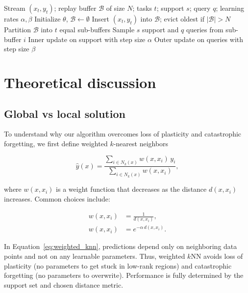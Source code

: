 \documentclass{article}
\begin{document}
\begin{algorithm}[t]
\caption{MAML with Replay Buffer (work in progress)}
\label{alg:maml_replay}
\begin{algorithmic}[1]
\Require Stream $(x_t,y_t)$; replay buffer $\mathcal{B}$ of size $N$; 
tasks $t$; support $s$; query $q$; learning rates $\alpha,\beta$
\State Initialize $\theta$, $\mathcal{B} \gets \emptyset$
    \State Insert $(x_t,y_t)$ into $\mathcal{B}$; evict oldest if $|\mathcal{B}|>N$
    \State Partition $\mathcal{B}$ into $t$ equal sub-buffers
        \State Sample $s$ support and $q$ queries from sub-buffer $i$
        \State Inner update on support with step size $\alpha$
        \State Outer update on queries with step size $\beta$
    \EndFor
\EndFor
\end{algorithmic}
\end{algorithm}


\section{Theoretical discussion}
\label{sec:theory}

\subsection{Global vs local solution}
\label{sec:local_global}
To understand why our algorithm overcomes loss of plasticity and catastrophic forgetting, we
first define weighted $k$-nearest neighbors

\begin{equation}
\hat{y}(x) = 
\frac{\sum\limits_{i \in N_k(x)} w(x, x_i)\, y_i}
     {\sum\limits_{i \in N_k(x)} w(x, x_i)},
\label{eq:weighted_knn}     
\end{equation}

where $w(x, x_i)$ is a weight function that decreases as the distance $d(x, x_i)$ increases.  
Common choices include:

\begin{align}
w(x, x_i) &= \frac{1}{d(x, x_i)}, \\
w(x, x_i) &= e^{-\alpha\, d(x, x_i)}.
\end{align}

In Equation~\ref{eq:weighted_knn}, predictions depend only on neighboring data points and not on any learnable parameters.  
Thus, weighted $k$NN avoids loss of plasticity (no parameters to get stuck in low-rank regions) and catastrophic forgetting (no parameters to overwrite).  
Performance is fully determined by the support set and chosen distance metric.  
\end{document}
